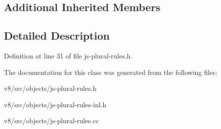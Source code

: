 \subsection*{Additional Inherited Members}


\subsection{Detailed Description}


Definition at line 31 of file js-\/plural-\/rules.\+h.



The documentation for this class was generated from the following files\+:\begin{DoxyCompactItemize}
\item 
v8/src/objects/js-\/plural-\/rules.\+h\item 
v8/src/objects/js-\/plural-\/rules-\/inl.\+h\item 
v8/src/objects/js-\/plural-\/rules.\+cc\end{DoxyCompactItemize}
